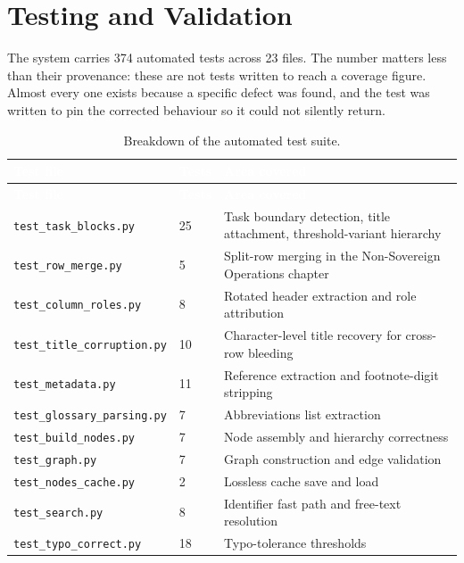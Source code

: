 \section{Testing and Validation}

The system carries 374 automated tests across 23 files. The number matters less than their provenance: these are not tests written to reach a coverage figure. Almost every one exists because a specific defect was found, and the test was written to pin the corrected behaviour so it could not silently return.

\begin{longtable}{|p{}|p{}|p{}|}
\caption{Breakdown of the automated test suite.}\label{tab:tests}\\
\hline
\rowcolor{myblue}\textcolor{white}{\textbf{Test file}} & \textcolor{white}{\textbf{Tests}} & \textcolor{white}{\textbf{Area covered}} \\
\hline
\endfirsthead
\hline
\rowcolor{myblue}\textcolor{white}{\textbf{Test file}} & \textcolor{white}{\textbf{Tests}} & \textcolor{white}{\textbf{Area covered}} \\
\hline
\endhead
\texttt{test\_task\_blocks.py} & 25 & Task boundary detection, title attachment, threshold-variant hierarchy \\ \hline
\texttt{test\_row\_merge.py} & 5 & Split-row merging in the Non-Sovereign Operations chapter \\ \hline
\texttt{test\_column\_roles.py} & 8 & Rotated header extraction and role attribution \\ \hline
\texttt{test\_title\_corruption.py} & 10 & Character-level title recovery for cross-row bleeding \\ \hline
\texttt{test\_metadata.py} & 11 & Reference extraction and footnote-digit stripping \\ \hline
\texttt{test\_glossary\_parsing.py} & 7 & Abbreviations list extraction \\ \hline
\texttt{test\_build\_nodes.py} & 7 & Node assembly and hierarchy correctness \\ \hline
\texttt{test\_graph.py} & 7 & Graph construction and edge validation \\ \hline
\texttt{test\_nodes\_cache.py} & 2 & Lossless cache save and load \\ \hline
\texttt{test\_search.py} & 8 & Identifier fast path and free-text resolution \\ \hline
\texttt{test\_typo\_correct.py} & 18 & Typo-tolerance thresholds \\ \hline

\end{longtable}
